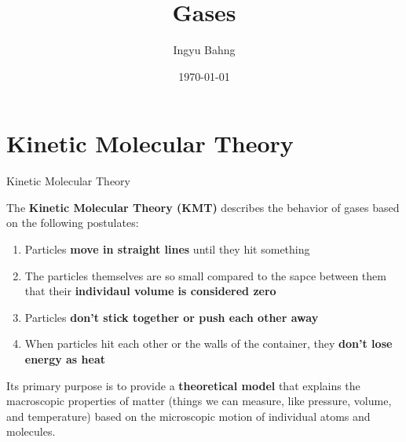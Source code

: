 \documentclass[10pt]{article}
\title{Gases}
\date{\today}
\author{Ingyu Bahng}
\begin{document}


\section{Kinetic Molecular Theory}

  \begin{core}{Kinetic Molecular Theory}

    The \textbf{Kinetic Molecular Theory (KMT)} describes the behavior of gases based on the following postulates:

    \begin{enumerate}

      \item Particles \textbf{move in straight lines} until they hit something

      \item The particles themselves are so small compared to the sapce between them that their \textbf{individaul volume is considered zero}

      \item Particles \textbf{don't stick together or push each other away}

      \item When particles hit each other or the walls of the container, they \textbf{don't lose energy as heat}
          
    \end{enumerate}

    Its primary purpose is to provide a \textbf{theoretical model} that explains the macroscopic properties of matter (things we can measure, like pressure, volume, and temperature) based on the microscopic motion of individual atoms and molecules.

  \end{core}
 
\end{document}
